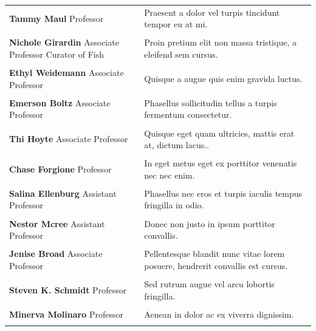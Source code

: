 \documentclass{book} %
\begin{document}
\begin{table}[ht!]
\begin{tabular}{p{2.5in} p{4.5in}}

\textbf{Tammy Maul} \newline Professor & Praesent a dolor vel turpis tincidunt tempor eu at mi.\\ \\
\textbf{Nichole Girardin} \newline Associate Professor \newline Curator of Fish & Proin pretium elit non massa tristique, a eleifend sem cursus.\\ \\
\textbf{Ethyl Weidemann} \newline Associate Professor & Quisque a augue quis enim gravida luctus.\\ \\
\textbf{Emerson Boltz} \newline Associate Professor & Phasellus sollicitudin tellus a turpis fermentum consectetur.\\ \\
\textbf{Thi Hoyte} \newline Associate Professor & Quisque eget quam ultricies, mattis erat at, dictum lacus..\\ \\
\textbf{Chase Forgione} \newline Professor & In eget metus eget ex porttitor venenatis nec nec enim.\\ \\
\textbf{Salina Ellenburg} \newline Assistant Professor & Phasellus nec eros et turpis iaculis tempus fringilla in odio.\\ \\
\textbf{Nestor Mcree} \newline Assistant Professor & Donec non justo in ipsum porttitor convallis.\\ \\
\textbf{Jenise Broad} \newline Associate Professor & Pellentesque blandit nunc vitae lorem posuere, hendrerit convallis est cursus.\\ \\
\textbf{Steven K. Schmidt} \newline Professor & Sed rutrum augue vel arcu lobortis fringilla.\\ \\
\textbf{Minerva Molinaro} \newline Professor & Aenean in dolor ac ex viverra dignissim.\\ \\

\end{tabular}
\end{table}
\end{document}
